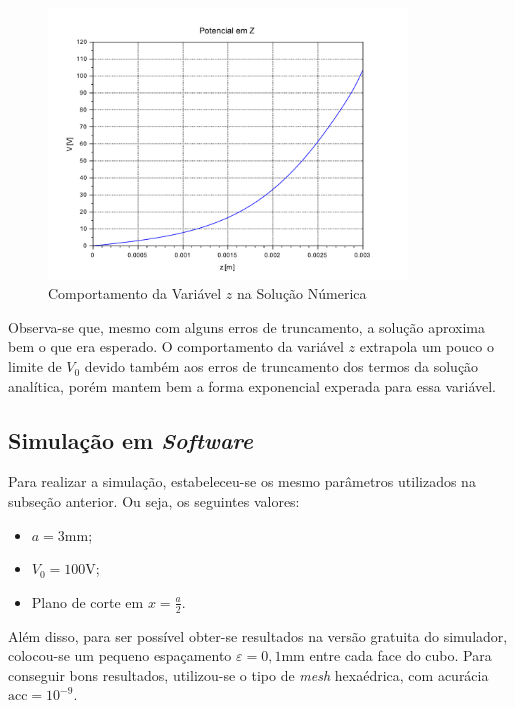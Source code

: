 \documentclass{report}
\begin{document}
\begin{figure}[h!]
  \centering
  \includegraphics[width=0.85\textwidth]{images/plots/numerical_potential_z.pdf}
  \caption{\label{plot:numerical_potential_z} Comportamento da Variável $ z $ na Solução Númerica}
\end{figure}

Observa-se que, mesmo com alguns erros de truncamento, a solução aproxima bem o que era esperado. O comportamento da variável $ z $ extrapola um
pouco o limite de $ V_0 $ devido também aos erros de truncamento dos termos da solução analítica, porém mantem bem a forma exponencial experada
para essa variável.

\clearpage
\subsection{Simulação em \textit{Software}}
\label{subsec:simul}

Para realizar a simulação, estabeleceu-se os mesmo parâmetros utilizados na subseção anterior. Ou seja, os seguintes valores:

\begin{itemize}
  \item $ a = 3 \text{mm}$;
  \item $ V_0 = 100 \text{V}$;
  \item Plano de corte em $ x = \frac{a}{2} $.
\end{itemize}

Além disso, para ser possível obter-se resultados na versão gratuita do simulador, colocou-se um pequeno espaçamento $ \varepsilon = 0,1\text{mm} $ entre cada face do cubo.
Para conseguir bons resultados, utilizou-se o tipo de \textit{mesh} hexaédrica, com acurácia $ \text{acc} = 10^{-9} $.
\end{document}
